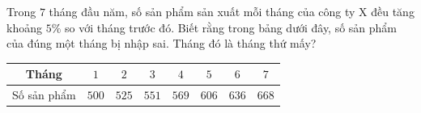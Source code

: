 \begin{ex}
Trong $7$ tháng đầu năm, số sản phẩm sản xuất mỗi tháng của công ty X đều tăng khoảng $5\%$ so với tháng trước đó. Biết rằng trong bảng dưới đây, số sản phẩm của đúng một tháng bị nhập sai. Tháng đó là tháng thứ mấy?
\begin{center}
\begin{tabular}{|c|c|c|c|c|c|c|c|}\hline
Tháng & $1$ & $2$ & $3$ & $4$ & $5$ & $6$ & $7$\\\hline
Số sản phẩm & $500$ & $525$ & $551$ & $569$ & $606$ & $636$ & $668$\\\hline
\end{tabular}
\end{center}
\end{ex}
